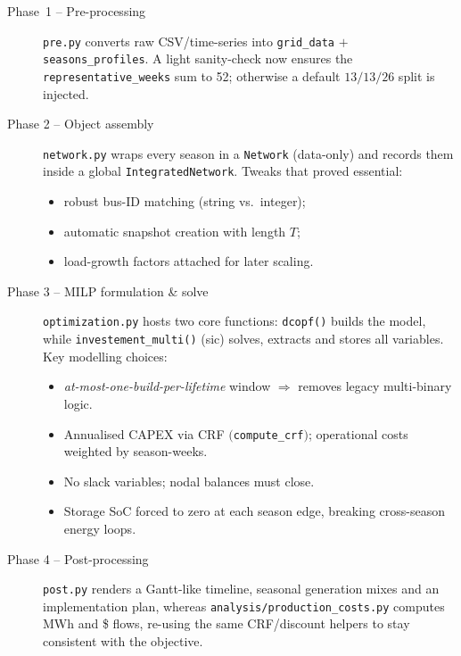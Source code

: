 \begin{description}
    \item[Phase~1 – Pre-processing]  
          \texttt{pre.py} converts raw CSV/time-series into
          \texttt{grid\_data} \(+\) \texttt{seasons\_profiles}.  
          A light sanity-check now ensures the
          \texttt{representative\_weeks} sum to 52; otherwise a
          default \(13/13/26\) split is injected.

    \item[Phase 2 – Object assembly]  
          \texttt{network.py} wraps every season in a
          \texttt{Network} (data-only) and records them inside a
          global \texttt{IntegratedNetwork}.  Tweaks that proved
          essential:
          \begin{itemize}
              \item robust bus-ID matching (string vs.\ integer);
              \item automatic snapshot creation with length \(T\);
              \item load-growth factors attached for later scaling.
          \end{itemize}

    \item[Phase 3 – MILP formulation \& solve]  
          \texttt{optimization.py} hosts two core functions:
          \texttt{dcopf()} builds the model, while
          \texttt{investement\_multi()} (sic) solves, extracts and
          stores all variables.  Key modelling choices:

          \begin{itemize}
              \item \emph{at-most-one-build-per-lifetime} window  
                    \(\Rightarrow\) removes legacy multi-binary logic.
              \item Annualised CAPEX via CRF \(\bigl(\)\texttt{compute\_crf}\(\bigr)\);
                    operational costs weighted by season-weeks.
              \item No slack variables; nodal balances must close.
              \item Storage SoC forced to zero at each season edge,
                    breaking cross-season energy loops.
          \end{itemize}

    \item[Phase 4 – Post-processing]  
          \texttt{post.py} renders a Gantt-like timeline, seasonal
          generation mixes and an implementation plan, whereas
          \texttt{analysis/production\_costs.py} computes MWh and
          \$ flows, re-using the same CRF/discount helpers to stay
          consistent with the objective.
\end{description}


